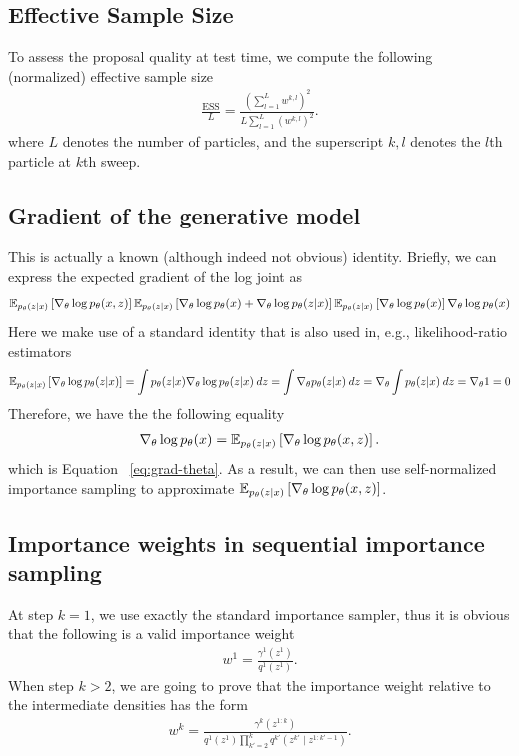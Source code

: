 \documentclass[anonymous=false, %
               format=acmsmall, %
               review=true, %
               screen=true, %
               nonacm=true]{acmart}
\theoremstyle{definition}
\begin{document}
\subsection{Effective Sample Size}
\label{appendix:ess}
To assess the proposal quality at test time, we compute the following (normalized) effective sample size
\begin{align}
\label{ess-eq}
    \frac{\text{ESS}}{L} 
    = 
    \frac{(\sum_{l=1}^L w^{k,l})^2}
         {L \sum_{l=1}^L (w^{k,l})^2}
    .
\end{align}
where $L$ denotes the number of particles, and the superscript $k, l$ denotes the $l$th particle at $k$th sweep.
\subsection{Gradient of the generative model}%
\label{appendix:grad-theta}
This is actually a known (although indeed not obvious) identity. Briefly, we can express the expected gradient of the log joint as
\begin{align*}
    \mathbb{E}_{p_\theta(z | x)} 
    \left[
    \nabla_\theta \log p_\theta(x, z)
    \right]
    \mathbb{E}_{p_\theta(z | x)} 
    \left[
    \nabla_\theta \log p_\theta(x) + \nabla_\theta \log p_\theta(z | x)
    \right]
    \mathbb{E}_{p_\theta(z | x)} 
    \left[
    \nabla_\theta \log p_\theta(x) 
    \right]
    \nabla_\theta \log p_\theta(x)
\end{align*}
Here we make use of a standard identity that is also used in, e.g., likelihood-ratio estimators
\begin{align*}
\mathbb{E}_{p_\theta(z | x)}
\left[
    \nabla_\theta \log p_\theta(z | x)
\right] 
=
\int p_\theta(z | x) \nabla_\theta \log p_\theta(z | x) \: dz
=
\int \nabla_\theta p_\theta(z | x) \: dz
=
\nabla_\theta \int p_\theta(z | x) \: dz
=
\nabla_\theta 1
= 
0
\end{align*}
Therefore, we have the the following equality
\begin{align*}
\nabla_\theta \log p_\theta(x) 
= 
\mathbb{E}_{p_\theta(z | x)} 
\left[
\nabla_\theta \log p_\theta(x, z)
\right].
\end{align*}
which is Equation ~\ref{eq:grad-theta}. As a result, we can then use self-normalized importance sampling to approximate     $\mathbb{E}_{p_\theta(z | x)} \left[\nabla_\theta \log p_\theta(x, z) \right]$.

\subsection{Importance weights in sequential importance sampling}
\label{appendix:sis-weight}
At step $k=1$, we use exactly the standard importance sampler, thus it is obvious that the following is a valid importance weight
\begin{align*}
    w^1 = \frac{\gamma^1(z^1)}{q^1(z^1)}.
\end{align*}
When step $k>2$, we are going to prove that the importance weight relative to the intermediate densities has the form
\begin{align}
    \label{appendix:eq:sis-weight}
    w^k
    = 
    \frac{\gamma^k(z^{1:k})}
         {q^1(z^1) \prod_{k'=2}^k q^{k'}(z^{k'} \mid z^{1:k'-1})}.
\end{align}
\end{document}
